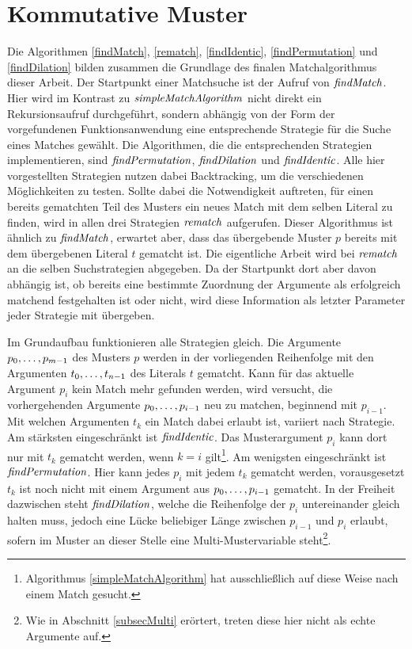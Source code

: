 \section{Kommutative Muster} \label{subsecACMuster}

Die Algorithmen \ref{findMatch}, \ref{rematch}, \ref{findIdentic}, \ref{findPermutation} und \ref{findDilation} bilden zusammen die Grundlage des finalen Matchalgorithmus dieser Arbeit. Der Startpunkt einer Matchsuche ist der Aufruf von $\mathit{findMatch}$. Hier wird im Kontrast zu $\mathit{simpleMatchAlgorithm}$ nicht direkt ein Rekursionsaufruf durchgeführt, sondern abhängig von der Form der vorgefundenen Funktionsanwendung eine entsprechende Strategie für die Suche eines Matches gewählt. Die Algorithmen, die die entsprechenden Strategien implementieren, sind $\mathit{findPermutation}$, $\mathit{findDilation}$ und $\mathit{findIdentic}$. Alle hier vorgestellten Strategien nutzen dabei Backtracking, um die verschiedenen Möglichkeiten zu testen. Sollte dabei die Notwendigkeit auftreten, für einen bereits gematchten Teil des Musters ein neues Match mit dem selben Literal zu finden, wird in allen drei Strategien $\mathit{rematch}$ aufgerufen. Dieser Algorithmus ist ähnlich zu $\mathit{findMatch}$, erwartet aber, dass das übergebende Muster $p$ bereits mit dem übergebenen Literal $t$ gematcht ist. Die eigentliche Arbeit wird bei $\mathit{rematch}$ an die selben Suchstrategien abgegeben. Da der Startpunkt dort aber davon abhängig ist, ob bereits eine bestimmte Zuordnung der Argumente als erfolgreich matchend festgehalten ist oder nicht, wird diese Information als letzter Parameter jeder Strategie mit übergeben.


Im Grundaufbau funktionieren alle Strategien gleich. Die Argumente ${p}_{0}, \dots, {p}_{m-1}$ des Musters $p$ werden in der vorliegenden Reihenfolge mit den Argumenten ${t}_{0}, \dots, {t}_{n-1}$ des Literals $t$ gematcht. Kann für das aktuelle Argument $p_i$ kein Match mehr gefunden werden, wird versucht, die vorhergehenden Argumente ${p}_{0}, \dots, {p}_{i-1}$ neu zu matchen, beginnend mit $p_{i-1}$. Mit welchen Argumenten $t_k$ ein Match dabei erlaubt ist, variiert nach Strategie. Am stärksten eingeschränkt ist $\mathit{findIdentic}$. Das Musterargument $p_i$ kann dort nur mit $t_k$ gematcht werden, wenn $k = i$ gilt\footnote{Algorithmus \ref{simpleMatchAlgorithm} hat ausschließlich auf diese Weise nach einem Match gesucht.}. Am wenigsten eingeschränkt ist $\mathit{findPermutation}$. Hier kann jedes $p_i$ mit jedem $t_k$ gematcht werden, vorausgesetzt $t_k$ ist noch nicht mit einem Argument aus ${p}_{0}, \dots, {p}_{i-1}$ gematcht. In der Freiheit dazwischen steht $\mathit{findDilation}$, welche die Reihenfolge der $p_i$ untereinander gleich halten muss, jedoch eine Lücke beliebiger Länge zwischen $p_{i-1}$ und $p_i$ erlaubt, sofern im Muster an dieser Stelle eine Multi-Mustervariable steht\footnote{Wie in Abschnitt \ref{subsecMulti} erörtert, treten diese hier nicht als echte Argumente auf.}.

